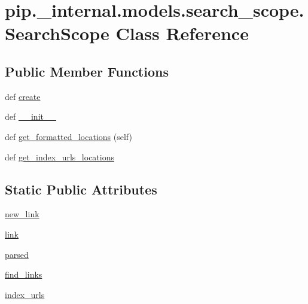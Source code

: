 \hypertarget{classpip_1_1__internal_1_1models_1_1search__scope_1_1SearchScope}{}\section{pip.\+\_\+internal.\+models.\+search\+\_\+scope.\+Search\+Scope Class Reference}
\label{classpip_1_1__internal_1_1models_1_1search__scope_1_1SearchScope}
\subsection*{Public Member Functions}
\begin{DoxyCompactItemize}
\item 
def \hyperlink{classpip_1_1__internal_1_1models_1_1search__scope_1_1SearchScope_aa52fb06daa89c6f58ae4734b4f349757}{create}
\item 
def \hyperlink{classpip_1_1__internal_1_1models_1_1search__scope_1_1SearchScope_a96e789804bbe36862cf339fcb5e5c4ae}{\+\_\+\+\_\+init\+\_\+\+\_\+}
\item 
def \hyperlink{classpip_1_1__internal_1_1models_1_1search__scope_1_1SearchScope_ac6e774122d227724a1caf2c349aa3041}{get\+\_\+formatted\+\_\+locations} (self)
\item 
def \hyperlink{classpip_1_1__internal_1_1models_1_1search__scope_1_1SearchScope_a5006b872220cc5b2a00de1f24172a27a}{get\+\_\+index\+\_\+urls\+\_\+locations}
\end{DoxyCompactItemize}
\subsection*{Static Public Attributes}
\begin{DoxyCompactItemize}
\item 
\hyperlink{classpip_1_1__internal_1_1models_1_1search__scope_1_1SearchScope_a7ca611f1d2b1841a9449192317091698}{new\+\_\+link}
\item 
\hyperlink{classpip_1_1__internal_1_1models_1_1search__scope_1_1SearchScope_aa64bf0ef6a29f46476dca288ca994d29}{link}
\item 
\hyperlink{classpip_1_1__internal_1_1models_1_1search__scope_1_1SearchScope_a1015c4c58903a98934e781ab06ba0b68}{parsed}
\item 
\hyperlink{classpip_1_1__internal_1_1models_1_1search__scope_1_1SearchScope_ad6cf9374b6acb55433b73989d7da6a97}{find\+\_\+links}
\item 
\hyperlink{classpip_1_1__internal_1_1models_1_1search__scope_1_1SearchScope_a874836737b4a33819768faa2223a41b1}{index\+\_\+urls}
\end{DoxyCompactItemize}



